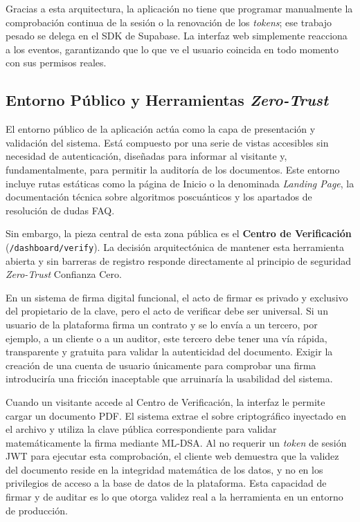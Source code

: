 \documentclass[11pt, a4paper]{report}
\theoremstyle{definition}
\begin{document}
Gracias a esta arquitectura, la aplicación no tiene que programar manualmente la comprobación continua de la sesión o la renovación de los \textit{tokens}; ese trabajo pesado se delega en el SDK de Supabase. La interfaz web simplemente reacciona a los eventos, garantizando que lo que ve el usuario coincida en todo momento con sus permisos reales.

\subsection{Entorno Público y Herramientas \textit{Zero-Trust}}
\label{subsec:entorno_publico}

El entorno público de la aplicación actúa como la capa de presentación y validación del sistema. Está compuesto por una serie de vistas accesibles sin necesidad de autenticación, diseñadas para informar al visitante y, fundamentalmente, para permitir la auditoría de los documentos. Este entorno incluye rutas estáticas como la página de Inicio o la denominada \textit{Landing Page}, la documentación técnica sobre algoritmos poscuánticos y los apartados de resolución de dudas FAQ. 

Sin embargo, la pieza central de esta zona pública es el \textbf{Centro de Verificación} (\texttt{/dashboard/verify}). La decisión arquitectónica de mantener esta herramienta abierta y sin barreras de registro responde directamente al principio de seguridad \textit{Zero-Trust} Confianza Cero.

En un sistema de firma digital funcional, el acto de firmar es privado y exclusivo del propietario de la clave, pero el acto de verificar debe ser universal. Si un usuario de la plataforma firma un contrato y se lo envía a un tercero, por ejemplo, a un cliente o a un auditor, este tercero debe tener una vía rápida, transparente y gratuita para validar la autenticidad del documento. Exigir la creación de una cuenta de usuario únicamente para comprobar una firma introduciría una fricción inaceptable que arruinaría la usabilidad del sistema.

Cuando un visitante accede al Centro de Verificación, la interfaz le permite cargar un documento PDF. El sistema extrae el sobre criptográfico inyectado en el archivo y utiliza la clave pública correspondiente para validar matemáticamente la firma mediante ML-DSA. Al no requerir un \textit{token} de sesión JWT para ejecutar esta comprobación, el cliente web demuestra que la validez del documento reside en la integridad matemática de los datos, y no en los privilegios de acceso a la base de datos de la plataforma. Esta capacidad de firmar y de auditar es lo que otorga validez real a la herramienta en un entorno de producción.
\end{document}
